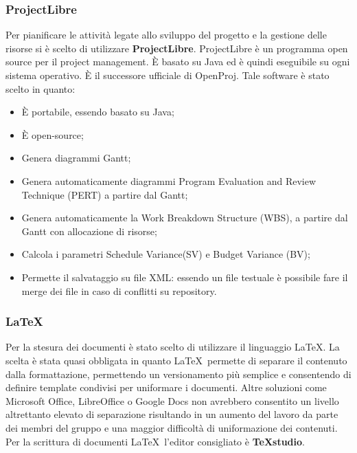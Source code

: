\documentclass[../NormeDiProgetto.tex]{subfiles}
\begin{document}
			\subsubsection{ProjectLibre}
				Per pianificare le attività legate allo sviluppo del progetto e la gestione delle risorse si è scelto di utilizzare \textbf{ProjectLibre}.
				ProjectLibre è un programma open source per il project management. È basato su Java ed è quindi eseguibile su ogni sistema operativo. È il successore ufficiale di OpenProj. Tale software è stato scelto in quanto:
				\begin{itemize}
					\item È portabile, essendo basato su Java;
					\item È open-source;
					\item Genera diagrammi Gantt;
					\item Genera automaticamente diagrammi Program Evaluation and Review Technique (PERT\ped{G}) a partire dal Gantt;
					\item Genera automaticamente la Work Breakdown Structure (WBS), a partire dal Gantt con allocazione di risorse;
					\item Calcola i parametri Schedule Variance\ped{G}(SV) e Budget Variance (BV);
					\item Permette il salvataggio su file XML: essendo un file testuale è possibile fare il merge dei file in caso di conflitti su repository. 
				\end{itemize}
			\subsubsection{\LaTeX}
				Per la stesura dei documenti è stato scelto di utilizzare il linguaggio \LaTeX.
				La scelta è stata quasi obbligata in quanto \LaTeX\ permette di separare il contenuto dalla formattazione, permettendo un versionamento più semplice e consentendo di definire template condivisi per uniformare i documenti. Altre soluzioni come Microsoft Office, LibreOffice o Google Docs non avrebbero consentito un livello altrettanto elevato di separazione risultando in un aumento del lavoro da parte dei membri del gruppo e una maggior difficoltà di uniformazione dei contenuti.
				Per la scrittura di documenti \LaTeX\ l’editor consigliato è \textbf{TeXstudio}.
				
\end{document}

